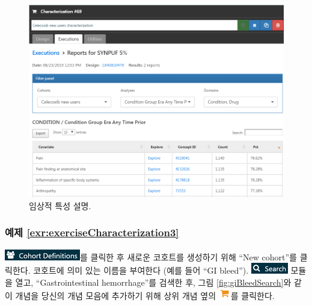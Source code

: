 \documentclass[10.5pt]{book}
\theoremstyle{definition}
\theoremstyle{definition}
\theoremstyle{definition}
\theoremstyle{remark}
\begin{document}
\begin{figure}

{\centering \includegraphics[width=1\linewidth]{images/SuggestedAnswers/celecoxibCharacterizationResults} 

}

\caption{임상적 특성 설명.}\label{fig:celecoxibCharacterizationResults}
\end{figure}

\subsubsection*{예제
\ref{exr:exerciseCharacterization3}}\label{-refexrexercisecharacterization3}

\includegraphics{images/Cohorts/cohortdefinition.png}를 클릭한 후 새로운
코호트를 생성하기 위해 ``New cohort''를 클릭한다. 코호트에 의미 있는
이름을 부여한다 (예를 들어 ``GI bleed'').
\includegraphics{images/Cohorts/search-2.png} 모듈을 열고,
``Gastrointestinal hemorrhage''를 검색한 후, 그림
\ref{fig:giBleedSearch}와 같이 개념을 당신의 개념 모음에 추가하기 위해
상위 개념 옆의 \includegraphics{images/Cohorts/shoppingcart.png}를
클릭한다.
\end{document}
